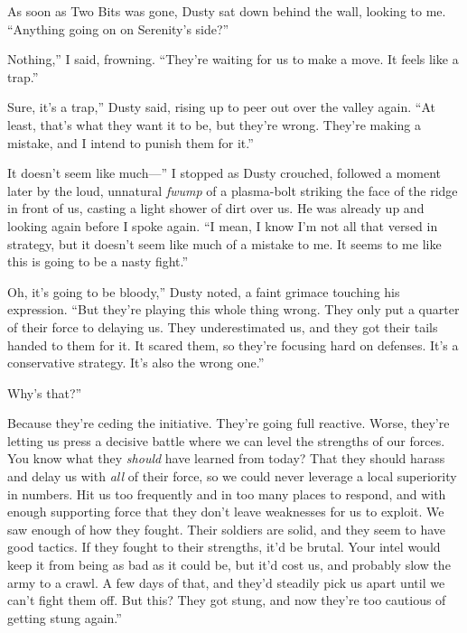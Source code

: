 As soon as Two Bits was gone, Dusty sat down behind the wall, looking to me. “Anything going on on Serenity’s side?”

\leavevmode{}Nothing,” I said, frowning. “They’re waiting for us to make a move. It feels like a trap.”

\leavevmode{}Sure, it’s a trap,” Dusty said, rising up to peer out over the valley again. “At least, that’s what they want it to be, but they’re wrong. They’re making a mistake, and I intend to punish them for it.”

\leavevmode{}It doesn’t seem like much—” I stopped as Dusty crouched, followed a moment later by the loud, unnatural \textit{fwump} of a plasma-bolt striking the face of the ridge in front of us, casting a light shower of dirt over us. He was already up and looking again before I spoke again. “I mean, I know I’m not all that versed in strategy, but it doesn’t seem like much of a mistake to me. It seems to me like this is going to be a nasty fight.”

\leavevmode{}Oh, it’s going to be bloody,” Dusty noted, a faint grimace touching his expression. “But they’re playing this whole thing wrong. They only put a quarter of their force to delaying us. They underestimated us, and they got their tails handed to them for it. It scared them, so they’re focusing hard on defenses. It’s a conservative strategy. It’s also the wrong one.”

\leavevmode{}Why’s that?”

\leavevmode{}Because they’re ceding the initiative. They’re going full reactive. Worse, they’re letting us press a decisive battle where we can level the strengths of our forces. You know what they \textit{should} have learned from today? That they should harass and delay us with \textit{all} of their force, so we could never leverage a local superiority in numbers. Hit us too frequently and in too many places to respond, and with enough supporting force that they don’t leave weaknesses for us to exploit. We saw enough of how they fought. Their soldiers are solid, and they seem to have good tactics. If they fought to their strengths, it’d be brutal. Your intel would keep it from being as bad as it could be, but it’d cost us, and probably slow the army to a crawl. A few days of that, and they’d steadily pick us apart until we can’t fight them off. But this? They got stung, and now they’re too cautious of getting stung again.”

